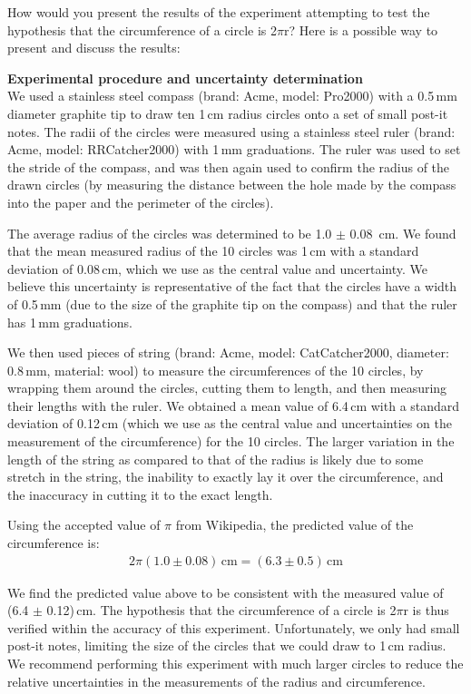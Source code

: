 \begin{example}{0pt}{How would you present the results of the experiment attempting to test the hypothesis that the circumference of a circle is 2$\pi$r?}{}
\label{ex:chapIntro_2pir}
Here is a possible way to present and discuss the results:

{\bf Experimental procedure and uncertainty determination}\\
We used a stainless steel compass (brand: Acme, model: Pro2000) with a 0.5\,mm diameter graphite tip to draw ten 1\,cm radius circles onto a set of small post-it notes. The radii of the circles were measured using a stainless steel ruler (brand: Acme, model: RRCatcher2000) with 1\,mm graduations. The ruler was used to set the stride of the compass, and was then again used to confirm the radius of the drawn circles (by measuring the distance between the hole made by the compass into the paper and the perimeter of the circles).

The average radius of the circles was determined to be 1.0 $\pm$ 0.08 \,cm. We found that the mean measured radius of the 10 circles was 1\,cm with a standard deviation of 0.08\,cm, which we use as the central value and uncertainty. We believe this uncertainty is representative of the fact that the circles have a width of 0.5\,mm (due to the size of the graphite tip on the compass) and that the ruler has 1\,mm graduations.  

We then used pieces of string (brand: Acme, model: CatCatcher2000, diameter: 0.8\,mm, material: wool) to measure the circumferences of the 10 circles, by wrapping them around the circles, cutting them to length, and then measuring their lengths with the ruler. We obtained a mean value of 6.4\,cm with a standard deviation of 0.12\,cm (which we use as the central value and uncertainties on the measurement of the circumference) for the 10 circles. The larger variation in the length of the string as compared to that of the radius is likely due to some stretch in the string, the inability to exactly lay it over the circumference, and the inaccuracy in cutting it to the exact length.

Using the accepted value of $\pi$ from Wikipedia, the predicted value of the circumference is:
\begin{align*}
2\pi(1.0\pm 0.08)\,\text{cm}=(6.3\pm 0.5)\,\text{cm}
\end{align*}

We find the predicted value above to be consistent with the measured value of (6.4 $\pm$ 0.12)\,cm. The hypothesis that the circumference of a circle is 2$\pi$r is thus verified within the accuracy of this experiment. Unfortunately, we only had small post-it notes, limiting the size of the circles that we could draw to 1\,cm radius. We recommend performing this experiment with much larger circles to reduce the relative uncertainties in the measurements of the radius and circumference.


\end{example}
